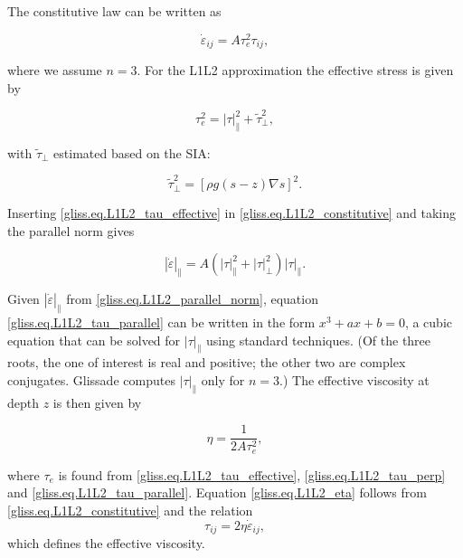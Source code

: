 {\noindent
The constitutive law can be written as 

\begin{equation}
  \label{gliss.eq.L1L2_constitutive}
  {{\dot{\varepsilon }}_{ij}} = A \tau _{e}^{2} {{\tau }_{ij}},
\end{equation}

\noindent
where we assume $n=3$.  For the L1L2 approximation the effective stress is given by

\begin{equation}
  \label{gliss.eq.L1L2_tau_effective}
  \tau _{e}^{2} = \left| \tau  \right|_{\parallel }^{2} + \tilde{\tau}_{\perp}^2,
\end{equation}

\noindent
with $\tilde{\tau}_{\perp}$ estimated based on the SIA:

\begin{equation}
  \label{gliss.eq.L1L2_tau_perp}
  \tilde{\tau}_{\perp}^{2} = {\left[ \rho g(s-z)\nabla s \right]}^2.
\end{equation}

\noindent
Inserting \eqref{gliss.eq.L1L2_tau_effective} in \eqref{gliss.eq.L1L2_constitutive} and taking 
the parallel norm gives

\begin{equation}
  \label{gliss.eq.L1L2_tau_parallel}
        {\left| {\dot{\varepsilon }} \right|}_{\parallel}
        = A (\left| \tau \right|_{\parallel}^{2} + \left| \tau \right|_{\perp}^{2}) {{\left| \tau \right|}_{\parallel}}.
\end{equation}

\noindent
Given ${\left| {\dot{\varepsilon }} \right|}_{\parallel}$ from \eqref{gliss.eq.L1L2_parallel_norm},
equation \eqref{gliss.eq.L1L2_tau_parallel} can be written in the form $x^3 + a x + b = 0$,
a cubic equation that can be solved for ${\left| \tau \right|}_{\parallel}$ using standard techniques.
(Of the three roots, the one of interest is real and positive; the other two are complex conjugates.
Glissade computes ${\left| \tau \right|}_{\parallel}$ only for $n = 3$.)
The effective viscosity at depth $z$ is then given by

\begin{equation}
  \label{gliss.eq.L1L2_eta}
  \eta  = \frac{1}{2A \tau_{e}^{2}},
\end{equation}

\noindent
where $\tau_{e}$ is found from \eqref{gliss.eq.L1L2_tau_effective},
\eqref{gliss.eq.L1L2_tau_perp} and \eqref{gliss.eq.L1L2_tau_parallel}.
Equation \eqref{gliss.eq.L1L2_eta} follows from \eqref{gliss.eq.L1L2_constitutive}
and the relation 
\begin{equation}
  \label{gliss.eq.L1L2_eta2}
  {\tau_{ij}} = 2\eta {\dot{\varepsilon}_{ij}},
\end{equation} 
which defines the effective viscosity.

}
